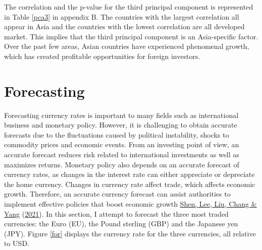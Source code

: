 \documentclass[11pt,preprint, authoryear]{elsarticle}
\numberwithin{equation}{section}
\numberwithin{figure}{section}
\numberwithin{table}{section}
\begin{document}
The correlation and the p-value for the third principal component is
represented in Table \ref{pca3} in appendix B. The countries with the
largest correlation all appear in Asia and the countries with the lowest
correlation are all developed market. This implies that the third
principal component is an Asia-specific factor. Over the past few areas,
Asian countries have experienced phenomenal growth, which has created
profitable opportunities for foreign investors.

\hypertarget{forecasting}{%
\section{Forecasting}\label{forecasting}}

Forecasting currency rates is important to many fields such as
international business and monetary policy. However, it is challenging
to obtain accurate forecasts due to the fluctuations caused by political
instability, shocks to commodity prices and economic events. From an
investing point of view, an accurate forecast reduces risk related to
international investments as well as maximizes returns. Monetary policy
also depends on an accurate forecast of currency rates, as changes in
the interest rate can either appreciate or depreciate the home currency.
Changes in currency rate affect trade, which affects economic growth.
Therefore, an accurate currency forecast can assist authorities to
implement effective policies that boost economic growth
\protect\hyperlink{ref-shen}{Shen, Lee, Liu, Chang \& Yang}
(\protect\hyperlink{ref-shen}{2021}). In this section, I attempt to
forecast the three most traded currencies: the Euro (EU), the Pound
sterling (GBP) and the Japanese yen (JPY). Figure \ref{for} displays the
currency rate for the three currencies, all relative to USD.
\end{document}
